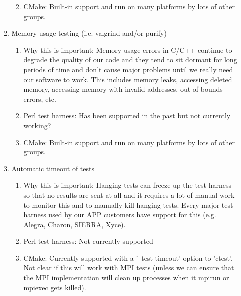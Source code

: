 \documentclass[pdf,ps2pdf,11pt]{SANDreport}
\begin{document}
\begin{enumerate}
\begin{enumerate}
\begin{enumerate}
    {}\item CMake: Built-in support and run on many platforms by lots
    of other groups.

    \end{enumerate}

  {}\item Memory usage testing (i.e. valgrind and/or purify)

    \begin{enumerate}

    {}\item Why this is important: Memory usage errors in C/C++
    continue to degrade the quality of our code and they tend to sit
    dormant for long periods of time and don't cause major problems
    until we really need our software to work.  This includes memory
    leaks, accessing deleted memory, accessing memory with invalid
    addresses, out-of-bounds errors, etc.

    {}\item Perl test harness: Has been supported in the past but not
    currently working?

    {}\item CMake: Built-in support and run on many platforms by lots
    of other groups.

    \end{enumerate}

  {}\item Automatic timeout of tests

    \begin{enumerate}

    {}\item Why this is important: Hanging tests can freeze up the
    test harness so that no results are sent at all and it requires a
    lot of manual work to monitor this and to manually kill hanging
    tests.  Every major test harness used by our APP customers have
    support for this (e.g. Alegra, Charon, SIERRA, Xyce).

    {}\item Perl test harness: Not currently supported

    {}\item CMake: Currently supported with a '--test-timeout' option
    to 'ctest'.  Not clear if this will work with MPI tests (unless we
    can ensure that the MPI implementation will clean up processes
    when it mpirun or mpiexec gets killed).

    \end{enumerate}


\end{enumerate}
\end{enumerate}
\end{document}
